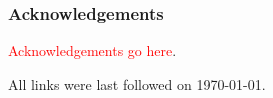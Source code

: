 \documentclass[runningheads,a4paper]{llncs}
\newcommand{\red}[1]{\textcolor{red}{#1}}
\begin{document}












\subsubsection*{Acknowledgements}

\red{Acknowledgements go here}.




All links were last followed on \today.


\end{document}
